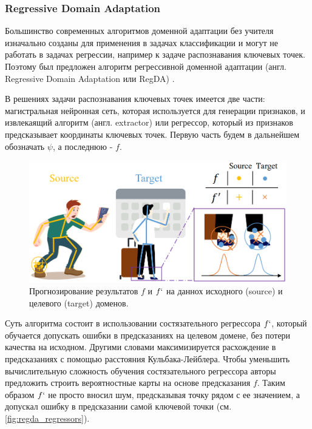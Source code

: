 \subsubsection*{Regressive Domain Adaptation}

Большинство современных алгоритмов доменной адаптации без учителя изначально созданы для применения в задачах классификации и могут не работать в задачах регрессии, например к задаче распознавания ключевых точек. Поэтому был предложен алгоритм регрессивной доменной адаптации (англ. Regressive Domain Adaptation или RegDA) \cite{regda}.

В решениях задачи распознавания ключевых точек имеется две части: магистральная нейронная сеть, которая используется для генерации признаков, и извлекаящий алгоритм (англ. extractor) или регрессор, который из признаков предсказывает координаты ключевых точек. Первую часть будем в дальнейшем обозначать $\psi$, а последнюю - $f$.

\begin{figure}[h]
	\centering
	\includegraphics[width=.8\textwidth]{./images/regda_regressors}
	\caption{Прогнозирование результатов $f$ и $f`$ на даннох исходного (source) и целевого (target) доменов. \cite{regda}}
	\label{fig:regda_regressors}
\end{figure}

Суть алгоритма состоит в использовании состязательного регрессора $f`$, который обучается допускать ошибки в предсказаниях на целевом домене, без потери качества на исходном. Другими словами максимизируется расхождение в предсказаниях с помощью расстояния Кульбака-Лейблера. Чтобы уменьшить вычислительную сложность обучения состязательного регрессора авторы предложить строить вероятностные карты на основе предсказания $f$. Таким образом $f`$ не просто вносил шум, предсказывая точку рядом с ее значением, а допускал ошибку в предсказании самой ключевой точки (см. \autoref{fig:regda_regressors}).


